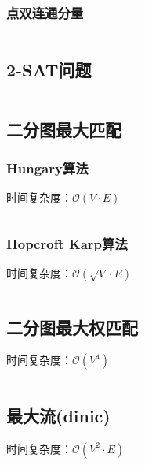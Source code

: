 \documentclass[a4paper]{article}
\newcommand{\cppcode}[1]{
    \inputminted[mathescape,
    frame=lines,linenos]{cpp}{source/#1}
}
\begin{document}
\cppcode{graph-theory/strongly-connected-components.cpp}


\subsubsection{点双连通分量}
\cppcode{graph-theory/point-two.cpp}


\subsection{2-SAT问题}

\cppcode{graph-theory/two-satisfiability.cpp}

\subsection{二分图最大匹配}

\subsubsection{Hungary算法}

时间复杂度：$\mathcal{O}(V \cdot E)$

\cppcode{graph-theory/Hungarian.cpp}

\subsubsection{Hopcroft Karp算法}

时间复杂度：$\mathcal{O}(\sqrt{V} \cdot E)$

\cppcode{graph-theory/HK.cpp}

\subsection{二分图最大权匹配}

时间复杂度：$\mathcal{O}(V^4)$

\cppcode{graph-theory/maximum-weight-matching.cpp}

\subsection{最大流(dinic)}
时间复杂度：$\mathcal{O}(V^2 \cdot E)$
\cppcode{graph-theory/dinic.cpp}
\end{document}
